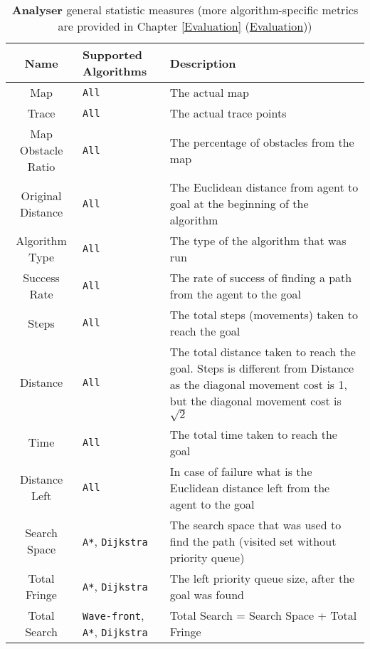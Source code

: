 \begin{table}[h!]
    \centerfloat
    \begin{tabular}{|c|M{2.7cm}|M{8cm}|}
         \hline
         \textbf{Name} & \textbf{Supported Algorithms} & \textbf{Description} \\
         \hline
         Map & \texttt{All} & The actual map \\
         \hline
         Trace & \texttt{All} & The actual trace points \\
         \hline
         Map Obstacle Ratio & \texttt{All} & The percentage of obstacles from the map \\
         \hline
         Original Distance & \texttt{All} & The Euclidean distance from agent to goal at the beginning of the algorithm \\
         \hline
         Algorithm Type & \texttt{All} & The type of the algorithm that was run \\
         \hline
         Success Rate & \texttt{All} & The rate of success of finding a path from the agent to the goal \\
         \hline
         Steps & \texttt{All} & The total steps (movements) taken to reach the goal \\
         \hline
         Distance & \texttt{All} & The total distance taken to reach the goal. Steps is different from Distance as the diagonal movement cost is 1, but the diagonal movement cost is $\sqrt{2}$ \\
         \hline
         Time & \texttt{All} & The total time taken to reach the goal \\
         \hline
         Distance Left & \texttt{All} & In case of failure what is the Euclidean distance left from the agent to the goal \\
         \hline
         Search Space & \texttt{A*}, \texttt{Dijkstra} & The search space that was used to find the path (visited set without priority queue) \\
         \hline
         Total Fringe & \texttt{A*}, \texttt{Dijkstra} & The left priority queue size, after the goal was found \\
         \hline
         Total Search & \texttt{Wave-front}, \texttt{A*}, \texttt{Dijkstra} & Total Search = Search Space + Total Fringe \\
         \hline
    \end{tabular}
    \caption{\textbf{Analyser} general statistic measures (more algorithm-specific metrics are provided in Chapter \ref {Evaluation} (\hyperref[Evaluation]{Evaluation}))}
    \label{tab: a_testing_tab}
\end{table}

